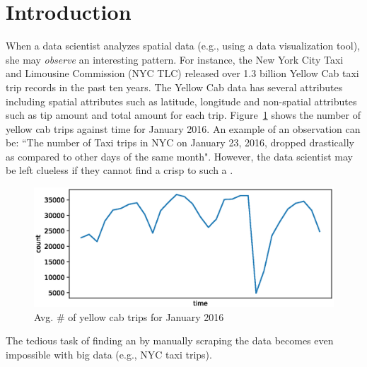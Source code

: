 \label{sec:Intro}
\section{Introduction}

When a data scientist analyzes spatial data (e.g., using a data visualization tool), she may {\em observe} an interesting pattern. 
For instance, the New York City Taxi and Limousine Commission (NYC TLC)\cite{taxi2016tlc} released over 1.3 billion Yellow Cab taxi trip records in the past ten years. The Yellow Cab data has several attributes including spatial attributes such as latitude, longitude and non-spatial attributes such as tip amount and total amount for each trip. Figure~\ref{fig:yellowstats} shows the number of yellow cab trips against time for January 2016. 
An example of an observation can be: ``The number of Taxi trips in NYC on January 23, 2016, dropped drastically as compared to other days of the same month". However, the data scientist may be left clueless if they cannot find a crisp {\explanation} to such a {\fact}. 
\begin{figure}[htp]
	\includegraphics[width=0.9\columnwidth]{images/yellowdata_count.eps}
	\caption{Avg. \# of yellow cab trips for January 2016}
	\label{fig:yellowstats}
\end{figure}
The tedious task of finding an {\explanation} by manually scraping the data becomes even impossible with big data (e.g., NYC taxi trips).



